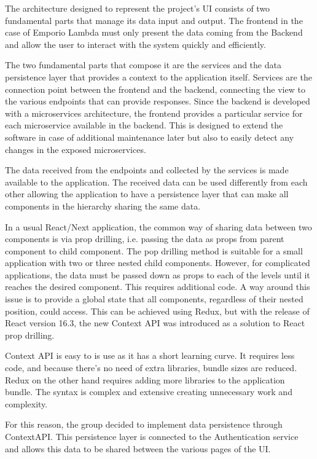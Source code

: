 The architecture designed to represent the project's UI consists of two fundamental parts that manage its data input and output. The frontend in the case of Emporio Lambda must only present the data coming from the Backend and allow the user to interact with the system quickly and efficiently.

The two fundamental parts that compose it are the services and the data persistence layer that provides a context to the application itself. Services are the connection point between the frontend and the backend, connecting the view to the various endpoints that can provide responses. Since the backend is developed with a microservices architecture, the frontend provides a particular service for each microservice available in the backend. This is designed to extend the software in case of additional maintenance later but also to easily detect any changes in the exposed microservices.

The data received from the endpoints and collected by the services is made available to the application. The received data can be used differently from each other allowing the application to have a persistence layer that can make all components in the hierarchy sharing the same data.

In a usual React/Next application, the common way of sharing data between two components is via prop drilling, i.e. passing the data as props from parent component to child component. The pop drilling method is suitable for a small application with two or three nested child components. However, for complicated applications, the data must be passed down as props to each of the levels until it reaches the desired component. This requires additional code. A way around this issue is to provide a global state that all components, regardless of their nested position, could access. This can be achieved using Redux, but with the release of React version 16.3, the new Context API was introduced as a solution to React prop drilling.

Context API is easy to is use as it has a short learning curve. It requires less code, and because there's no need of extra libraries, bundle sizes are reduced. Redux on the other hand requires adding more libraries to the application bundle. The syntax is complex and extensive creating unnecessary work and complexity.

For this reason, the group decided to implement data persistence through ContextAPI. This persistence layer is connected to the Authentication service and allows this data to be shared between the various pages of the UI.

